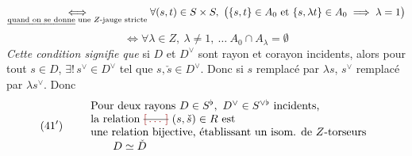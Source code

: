 \documentclass[11pt,a4paper]{article}
\begin{document}
\[
\underset{\text{\uncertain{quand on se donne} une $Z$-jauge stricte}}{\iff}
\forall (s,t) \in S \times S, \ \bigl(\{s,t\} \in A_0 \text{ et } \{s, \lambda t\} \in A_0 \implies \lambda = 1\bigr)
\]
\[
\iff \forall \lambda \in Z, \ \lambda \neq 1, \ \ldots\ A_0 \cap A_{\lambda} = \emptyset
\]
\emph{Cette condition signifie que} si $D$ et $D^{\vee}$ sont   rayon et corayon incidents, alors pour tout $s \in D$, $\exists!\, s^{\vee} \in D^{\vee}$ tel que $s, \check{s} \in D^{\vee}$. Donc si $s$ remplacé par $\lambda s$, $s^{\vee}$ remplacé par $\lambda s^{\vee}$. Donc  \struck{\ill{}}
\[
(41') \qquad
\begin{array}{l}
\text{Pour deux rayons } D \in S^{\flat}, \ D^{\vee} \in S^{\vee\flat} \text{ incidents,} \\
\text{la relation \struck{\ill{}}} \ (s, \check{s}) \in R \text{ est} \\
\text{une relation bijective, établissant un isom. de $Z$-torseurs} \\
\qquad D \simeq \check{D}
\end{array}
\]
\end{document}
